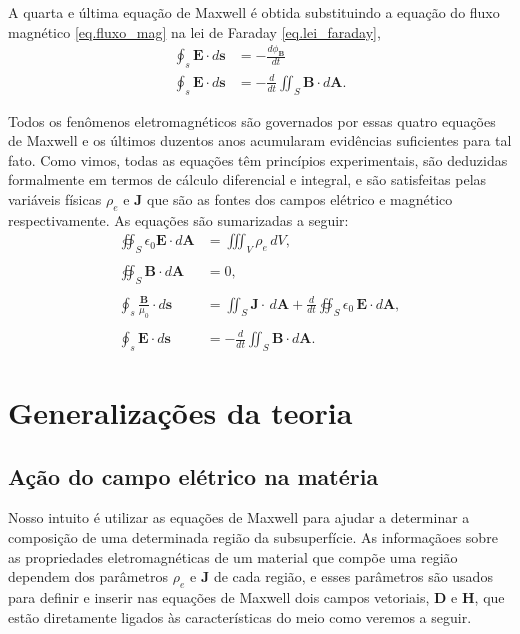 A quarta e última equação de Maxwell é obtida substituindo a equação do fluxo magnético \ref{eq.fluxo_mag} na lei de Faraday \ref{eq.lei_faraday},
\begin{align*}
\oint_s\mathbf{E}\cdot d\mathbf{s}&=-\frac{d\phi_\mathbf{B}}{dt}\\
\oint_s\mathbf{E}\cdot d\mathbf{s}&=-\frac{d}{dt}\iint_S\mathbf{B}\cdot d\mathbf{A}.
\end{align*}

Todos os fenômenos eletromagnéticos são governados por essas quatro equações de Maxwell  e os últimos duzentos anos acumularam evidências suficientes para tal fato. Como vimos, todas as equações têm princípios experimentais, são deduzidas formalmente em termos de cálculo diferencial e integral, e são satisfeitas pelas variáveis físicas $\rho_e$ e $\mathbf{J}$ que são as fontes dos campos elétrico e magnético respectivamente. As equações são sumarizadas a seguir:
\begin{align}\label{eq.maxwell_1}
\oiint_S\epsilon_0\textbf{E}\cdot\textit{d}\textbf{A}&=\iiint_{V}\rho_e\,dV,\\\nonumber\\\label{eq.maxwell_2}
\oiint_S\textbf{B}\cdot\textit{d}\textbf{A}&=0,\\\nonumber\\\label{eq.maxwell_3}
\oint_s\frac{\mathbf{B}}{\mu_0}\cdot d\mathbf{s}&=\iint_S\mathbf{J}\cdot\,d\mathbf{A}+\frac{d}{dt}\oiint_S\epsilon_0\,\textbf{E}\cdot\textit{d}\textbf{A},\\\nonumber\\\label{eq.maxwell_4}
\oint_s\mathbf{E}\cdot d\mathbf{s}&=-\frac{d}{dt}\iint_S\mathbf{B}\cdot d\mathbf{A}.
\end{align}

\section{Generalizações da teoria}

\subsection{Ação do campo elétrico na matéria}

Nosso intuito é utilizar as equações de Maxwell para ajudar a determinar a composição de uma determinada região da subsuperfície. As informaçãoes sobre as propriedades eletromagnéticas de um material que compõe uma região dependem dos parâmetros $\rho_e$ e $\mathbf{J}$ de cada região, e esses parâmetros são usados para definir e inserir nas equações de Maxwell dois campos vetoriais, $\mathbf{D}$ e $\mathbf{H}$, que estão diretamente ligados às características do meio como veremos a seguir.


